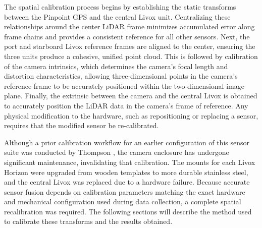 \documentclass{erauthesis}
\begin{document}
The spatial calibration process begins by establishing the static transforms between the Pinpoint GPS and the central Livox unit. Centralizing these relationships around the center LiDAR frame minimizes accumulated error along frame chains and provides a consistent reference for all other sensors.
Next, the port and starboard Livox reference frames are aligned to the center, ensuring the three units produce a cohesive, unified point cloud.
This is followed by calibration of the camera intrinsics, which determines the camera's focal length and distortion characteristics, allowing three-dimensional points in the camera's reference frame to be accurately positioned within the two-dimensional image plane.
Finally, the extrinsic between the camera and the central Livox is obtained to accurately position the LiDAR data in the camera's frame of reference.
Any physical modification to the hardware, such as repositioning or replacing a sensor, requires that the modified sensor be re-calibrated.

Although a prior calibration workflow for an earlier configuration of this sensor suite was conducted by Thompson \cite{thompson2023}, the camera enclosure has undergone significant maintenance, invalidating that calibration.
The mounts for each Livox Horizon were upgraded from wooden templates to more durable stainless steel, and the central Livox was replaced due to a hardware failure.
Because accurate sensor fusion depends on calibration parameters matching the exact hardware and mechanical configuration used during data collection, a complete spatial recalibration was required.
The following sections will describe the method used to calibrate these transforms and the results obtained. 


%
%
%
\end{document}
